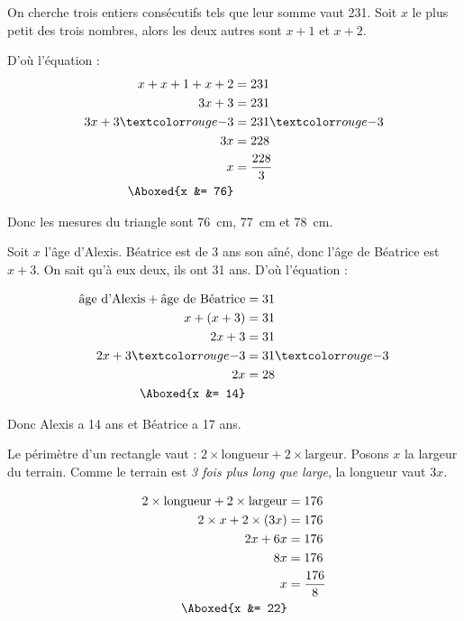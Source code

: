 \documentclass["../Cours.tex"]{subfiles}
\begin{document}
\begin{questions}
    \exercice On cherche trois entiers consécutifs tels que leur somme vaut 231. Soit $x$ le plus petit des trois nombres, alors les deux autres sont $x+1$ et $x+2$.

    D'où l'équation : 
    \begin{align*}
        x + x+1 + x+2 &= 231 \\
        3x + 3 &= 231 \\
        3x + 3 \red{-3} &= 231 \red{-3} \\
        3x &= 228 \\ 
        x &= \frac{228}{3} \\
        \Aboxed{x &= 76}
    \end{align*}

    Donc les mesures du triangle sont \qty{76}{\centi\metre}, \qty{77}{\centi\metre} et \qty{78}{\centi\metre}.

    \exercice Soit $x$ l'âge d'Alexis. Béatrice est de 3 ans son aîné, donc l'âge de Béatrice est $x+3$. On sait qu'à eux deux, ils ont 31 ans. D'où l'équation : 

    \begin{align*}
        \mbox{âge d'Alexis} + \mbox{âge de Béatrice} &= 31 \\ 
        x + (x+3) &= 31 \\ 
        2x + 3 &= 31 \\ 
        2x + 3 \red{-3} &= 31 \red{-3} \\ 
        2x &= 28 \\ 
        \Aboxed{x &= 14}
    \end{align*}

    Donc Alexis a 14 ans et Béatrice a 17 ans.

    \exercice Le périmètre d'un rectangle vaut : $2 \times \mbox{longueur} + 2 \times \mbox{largeur}$. Posons $x$ la largeur du terrain. Comme le terrain est \emph{3 fois plus long que large}, la longueur vaut $3x$.

    \begin{align*}
        2 \times \mbox{longueur} + 2 \times \mbox{largeur} &= 176 \\
        2 \times x + 2 \times (3x) &= 176 \\ 
        2x + 6x &= 176 \\ 
        8x &= 176 \\ 
        x &= \frac{176}{8} \\ 
        \Aboxed{x &= 22} 
    \end{align*}


\end{questions}
\end{document}
